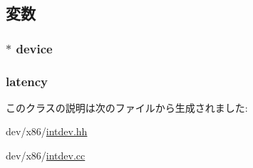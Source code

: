 \subsection{変数}
\hypertarget{classX86ISA_1_1IntDevice_1_1IntMasterPort_a213401fbaf58b821f38f6e274ddafadc}{
\subsubsection[{device}]{$\ast$ {\bf device}}}
\label{classX86ISA_1_1IntDevice_1_1IntMasterPort_a213401fbaf58b821f38f6e274ddafadc}
\hypertarget{classX86ISA_1_1IntDevice_1_1IntMasterPort_ac8d8966078cc047949fd1bca8feb21b6}{
\subsubsection[{latency}]{ {\bf latency}}}
\label{classX86ISA_1_1IntDevice_1_1IntMasterPort_ac8d8966078cc047949fd1bca8feb21b6}


このクラスの説明は次のファイルから生成されました:\begin{DoxyCompactItemize}
\item 
dev/x86/\hyperlink{intdev_8hh}{intdev.hh}\item 
dev/x86/\hyperlink{intdev_8cc}{intdev.cc}\end{DoxyCompactItemize}
